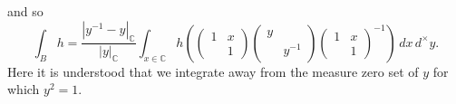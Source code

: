\documentclass[reqno]{amsart} 
\begin{document}
and so
\begin{equation*}
  \int_B h
  =
  \frac {|y^{-1} - y|_{\mathbb{C}}}{|y|_{\mathbb{C}}}
  \int_{x \in \mathbb{C}}
  h (
  \begin{pmatrix}
    1 & x \\
      & 1
  \end{pmatrix} 
  \begin{pmatrix}
    y &  \\
      & y^{-1}
  \end{pmatrix}
  \begin{pmatrix}
    1 & x \\
      & 1
  \end{pmatrix}
  ^{-1} ) \, d x \, d^\times y.
\end{equation*}
Here it is understood that we integrate away from the measure zero set of $y$ for which $y^2 = 1$.
\end{document}
